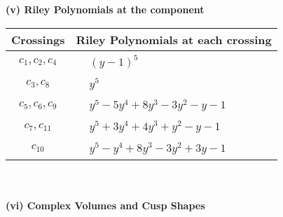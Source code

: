 \documentclass[1p]{elsarticle_modified}
\theoremstyle{definition}
\begin{document}
\newpage\renewcommand{\arraystretch}{1}
\flushleft \textbf{(v) Riley Polynomials at the component}\newline \\
\begin{tabular}{m{50pt}|m{274pt}}
Crossings & \hspace{64pt}Riley Polynomials at each crossing \\
\hline $$\begin{aligned}c_{1},c_{2},c_{4}\end{aligned}$$&$\begin{aligned}
&(y-1)^5
\end{aligned}$\\
\hline $$\begin{aligned}c_{3},c_{8}\end{aligned}$$&$\begin{aligned}
&y^5
\end{aligned}$\\
\hline $$\begin{aligned}c_{5},c_{6},c_{9}\end{aligned}$$&$\begin{aligned}
&y^5-5 y^4+8 y^3-3 y^2- y-1
\end{aligned}$\\
\hline $$\begin{aligned}c_{7},c_{11}\end{aligned}$$&$\begin{aligned}
&y^5+3 y^4+4 y^3+y^2- y-1
\end{aligned}$\\
\hline $$\begin{aligned}c_{10}\end{aligned}$$&$\begin{aligned}
&y^5- y^4+8 y^3-3 y^2+3 y-1
\end{aligned}$\\
\hline
\end{tabular}\\~\\
\newpage\flushleft \textbf{(vi) Complex Volumes and Cusp Shapes}
\end{document}
